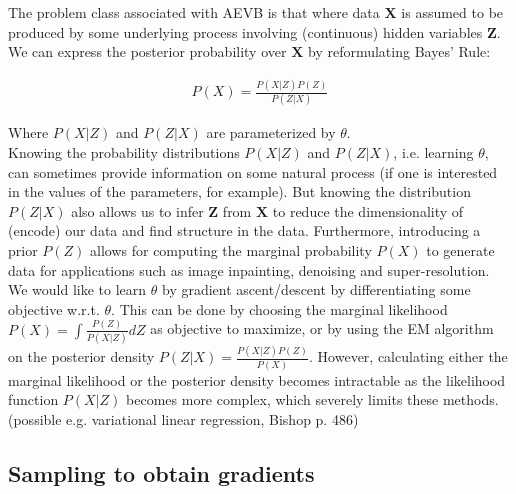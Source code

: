 \documentclass{article}
\begin{document}
The problem class associated with AEVB is that where data $\mathbf{X}$ is assumed to be produced by some underlying process involving (continuous) hidden variables $\mathbf{Z}$. We can express the posterior probability over $\mathbf{X}$ by reformulating Bayes' Rule:

\begin{align}
P(X) = \frac{P(X|Z)P(Z)}{P(Z|X)}
\end{align}

Where $P(X|Z)$ and $P(Z|X)$ are parameterized by $\theta$.
\\

Knowing the probability distributions $P(X|Z)$ and $P(Z|X)$, i.e. learning $\theta$, can sometimes provide information on some natural process (if one is interested in the values of the parameters, for example). But knowing the distribution $P(Z|X)$ also allows us to infer $\mathbf{Z}$ from $\mathbf{X}$ to reduce the dimensionality of (encode) our data and find structure in the data. Furthermore, introducing a prior $P(Z)$ allows for computing the marginal probability $P(X)$ to generate data for applications such as image inpainting, denoising and super-resolution.
We would like to learn $\theta$ by gradient ascent/descent by differentiating some objective w.r.t. $\theta$. This can be done by choosing the marginal likelihood $P(X) = \int \frac{P(Z)}{P(X|Z)}dZ$ as objective to maximize, or by using the EM algorithm on the posterior density $ P(Z|X) = \frac{P(X|Z)P(Z)}{P(X)}$. However, calculating either  the marginal likelihood or the posterior density becomes intractable as the likelihood function $P(X|Z)$	 becomes more complex, which severely limits these methods. (possible e.g. variational linear regression, Bishop p. 486)






\subsection{Sampling to obtain gradients}
\end{document}

